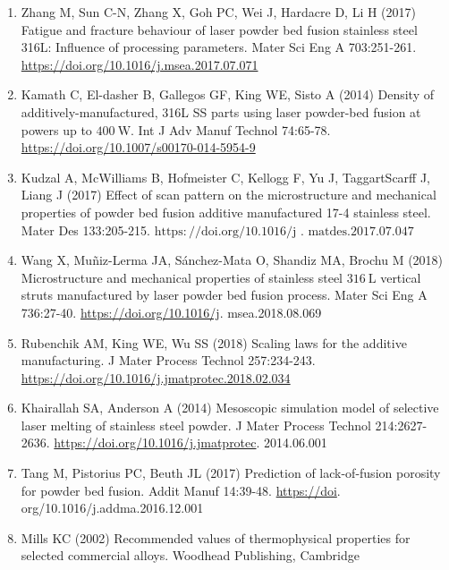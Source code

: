 \documentclass[10pt]{article}
\begin{document}
\begin{enumerate}
  \item Zhang M, Sun C-N, Zhang X, Goh PC, Wei J, Hardacre D, Li H (2017) Fatigue and fracture behaviour of laser powder bed fusion stainless steel 316L: Influence of processing parameters. Mater Sci Eng A 703:251-261. \href{https://doi.org/10.1016/j.msea.2017.07.071}{https://doi.org/10.1016/j.msea.2017.07.071}

  \item Kamath C, El-dasher B, Gallegos GF, King WE, Sisto A (2014) Density of additively-manufactured, 316L SS parts using laser powder-bed fusion at powers up to $400 \mathrm{~W}$. Int J Adv Manuf Technol 74:65-78. \href{https://doi.org/10.1007/s00170-014-5954-9}{https://doi.org/10.1007/s00170-014-5954-9}

  \item Kudzal A, McWilliams B, Hofmeister C, Kellogg F, Yu J, TaggartScarff J, Liang J (2017) Effect of scan pattern on the microstructure and mechanical properties of powder bed fusion additive manufactured 17-4 stainless steel. Mater Des 133:205-215. $\mathrm{https://doi.org/10.1016/ \textrm {j } . \text { matdes.2017.07.047 }}$

  \item Wang X, Muñiz-Lerma JA, Sánchez-Mata O, Shandiz MA, Brochu M (2018) Microstructure and mechanical properties of stainless steel $316 \mathrm{~L}$ vertical struts manufactured by laser powder bed fusion process. Mater Sci Eng A 736:27-40. \href{https://doi.org/10.1016/j}{https://doi.org/10.1016/j}. msea.2018.08.069

  \item Rubenchik AM, King WE, Wu SS (2018) Scaling laws for the additive manufacturing. J Mater Process Technol 257:234-243. \href{https://doi.org/10.1016/j.jmatprotec.2018.02.034}{https://doi.org/10.1016/j.jmatprotec.2018.02.034}

  \item Khairallah SA, Anderson A (2014) Mesoscopic simulation model of selective laser melting of stainless steel powder. J Mater Process Technol 214:2627-2636. \href{https://doi.org/10.1016/j.jmatprotec}{https://doi.org/10.1016/j.jmatprotec}. 2014.06.001

  \item Tang M, Pistorius PC, Beuth JL (2017) Prediction of lack-of-fusion porosity for powder bed fusion. Addit Manuf 14:39-48. \href{https://doi}{https://doi}. org/10.1016/j.addma.2016.12.001

  \item Mills KC (2002) Recommended values of thermophysical properties for selected commercial alloys. Woodhead Publishing, Cambridge


\end{enumerate}
\end{document}
